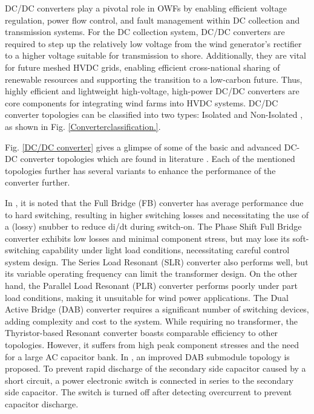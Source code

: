 \documentclass{ieeeaccess}
\begin{document}
DC/DC converters play a pivotal role in OWFs by enabling efficient voltage regulation, power flow control, and fault management within DC collection and transmission systems. For the DC collection system, DC/DC converters are required to step up the relatively low voltage from the wind generator's rectifier to a higher voltage suitable for transmission to shore. Additionally, they are vital for future meshed HVDC grids, enabling efficient cross-national sharing of renewable resources and supporting the transition to a low-carbon future. Thus, highly efficient and lightweight high-voltage, high-power DC/DC converters are core components for integrating wind farms into HVDC systems. DC/DC converter topologies can be classified into two types: Isolated and Non-Isolated \cite{elmenshawy2022medium}, as shown in Fig. \ref{Converterclassification.}.

 Fig. \ref{DC/DC converter} gives a glimpse of some of the basic and advanced DC-DC converter topologies which are found in literature  \cite{xiang2021comparison,ding2022study,li2022high,alagab2019dc,timmersdesign,lian2016dc,hu2021modular,dincan2017selection,erat2022dc}. Each of the mentioned topologies further has several variants to enhance the performance of the converter further.

In \cite{xiang2021comparison}, it is noted that the Full Bridge (FB) converter has average performance due to hard switching, resulting in higher switching losses and necessitating the use of a (lossy) snubber to reduce di/dt during switch-on. The Phase Shift Full Bridge converter exhibits low losses and minimal component stress, but may lose its soft-switching capability under light load conditions, necessitating careful control system design. The Series Load Resonant (SLR) converter also performs well, but its variable operating frequency can limit the transformer design. On the other hand, the Parallel Load Resonant (PLR) converter performs poorly under part load conditions, making it unsuitable for wind power applications. The Dual Active Bridge (DAB) converter requires a significant number of switching devices, adding complexity and cost to the system. While requiring no transformer, the Thyristor-based Resonant converter boasts comparable efficiency to other topologies. However, it suffers from high peak component stresses and the need for a large AC capacitor bank. In \cite{ding2022study}, an improved DAB submodule topology is proposed. To prevent rapid discharge of the secondary side capacitor caused by a short circuit, a power electronic switch is connected in series to the secondary side capacitor. The switch is turned off after detecting overcurrent to prevent capacitor discharge.
\end{document}
